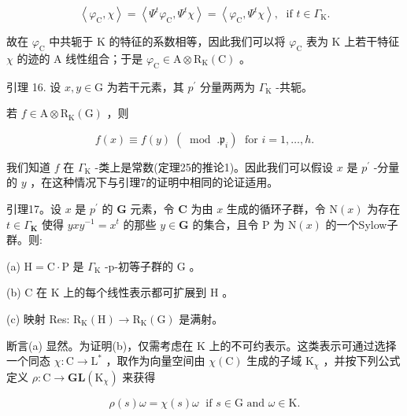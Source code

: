 \documentclass[10pt]{article}
\begin{document}
\[
\left\langle  {{\varphi }_{\mathrm{C}},\chi }\right\rangle   = \left\langle  {{\Psi }^{t}{\varphi }_{\mathrm{C}},{\Psi }^{t}\chi }\right\rangle   = \left\langle  {{\varphi }_{\mathrm{C}},{\Psi }^{t}\chi }\right\rangle  ,\;\text{ if }t \in  {\Gamma }_{\mathrm{K}}.
\]

故在 \({\varphi }_{\mathrm{C}}\) 中共轭于 \(\mathrm{K}\) 的特征的系数相等，因此我们可以将 \({\varphi }_{\mathrm{C}}\) 表为 \(\mathrm{K}\) 上若干特征 \(\chi\) 的迹的 A 线性组合；于是 \({\varphi }_{\mathrm{C}} \in  \mathrm{A} \otimes  {\mathrm{R}}_{\mathrm{K}}\left( \mathrm{C}\right)\) 。

引理 16. 设 \(x,y \in  \mathrm{G}\) 为若干元素，其 \({p}^{\prime }\) 分量两两为 \({\Gamma }_{\mathrm{K}}\) -共轭。

若 \(f \in  \mathrm{A} \otimes  {\mathrm{R}}_{\mathrm{K}}\left( \mathrm{G}\right)\) ，则

\[
f\left( x\right)  \equiv  f\left( y\right) \;\left( {\;\operatorname{mod}\;.{\mathfrak{p}}_{i}}\right) \;\text{ for }i = 1,\ldots ,h.
\]

我们知道 \(f\) 在 \({\Gamma }_{\mathrm{K}}\) -类上是常数(定理25的推论1)。因此我们可以假设 \(x\) 是 \({p}^{\prime }\) -分量的 \(y\) ，在这种情况下与引理7的证明中相同的论证适用。

引理17。设 \(x\) 是 \({p}^{\prime }\) 的 \(\mathbf{G}\) 元素，令 \(\mathbf{C}\) 为由 \(x\) 生成的循环子群，令 \(\mathrm{N}\left( x\right)\) 为存在 \(t \in  {\Gamma }_{\mathbf{K}}\) 使得 \({yx}{y}^{-1} = {x}^{t}\) 的那些 \(y \in  \mathbf{G}\) 的集合，且令 \(\mathrm{P}\) 为 \(\mathrm{N}\left( x\right)\) 的一个Sylow子群。则:

(a) \(\mathrm{H} = \mathrm{C} \cdot  \mathrm{P}\) 是 \({\Gamma }_{\mathrm{K}}\) -p-初等子群的 \(\mathrm{G}\) 。

(b) \(\mathrm{C}\) 在 \(\mathrm{K}\) 上的每个线性表示都可扩展到 \(\mathrm{H}\) 。

(c) 映射 Res: \({\mathrm{R}}_{\mathrm{K}}\left( \mathrm{H}\right)  \rightarrow  {\mathrm{R}}_{\mathrm{K}}\left( \mathrm{G}\right)\) 是满射。

断言(a) 显然。为证明(b)，仅需考虑在 K 上的不可约表示。这类表示可通过选择一个同态 \(\chi  : \mathrm{C} \rightarrow  {\mathrm{L}}^{ * }\) ，取作为向量空间由 \(\chi \left( \mathrm{C}\right)\) 生成的子域 \({\mathrm{K}}_{\chi }\) ，并按下列公式定义 \(\rho  : \mathrm{C} \rightarrow  \mathbf{{GL}}\left( {\mathrm{K}}_{\chi }\right)\) 来获得

\[
\rho \left( s\right) \omega  = \chi \left( s\right) \omega \;\text{ if }s \in  \mathrm{G}\text{ and }\omega  \in  \mathrm{K}.
\]
\end{document}
